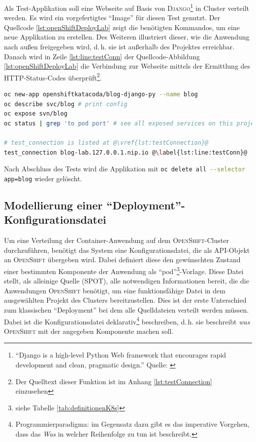 \par
Als Test-Applikation soll eine Webseite auf Basis von \textsc{Django}\footnote{\enquote{Django is a high-level Python Web framework that encourages rapid development and clean, pragmatic design.} Quelle: \cite[][]{django_software_foundation_web_2020}} in Cluster verteilt werden. Es wird ein vorgefertigtes \enquote{Image} für diesen Test genutzt. Der Quellcode \vref{lst:openShiftDeployLab} zeigt die benötigten Kommandos, um eine neue Applikation zu erstellen. Des Weiteren illustriert dieser, wie die Anwendung nach außen freigegeben wird, d.\,h. sie ist außerhalb des Projektes erreichbar. Danach wird in Zeile \vref{lst:line:testConn} der Quellcode-Abbildung \vref{lst:openShiftDeployLab} die Verbindung zur Webseite mittels der Ermittlung des \textsc{HTTP}-Status-Codes überprüft\footnote{Der Quelltext dieser Funktion ist im Anhang \vref{lst:testConnection} einzusehen}.

\begin{lstlisting}[language=bash, caption={Test-\enquote{Deployment} ins \textsc{OpenShift}-Cluster}, label={lst:openShiftDeployLab}]
oc new-app openshiftkatacoda/blog-django-py --name blog
oc describe svc/blog # print config 
oc expose svn/blog
oc status | grep 'to pod port' # see all exposed services on this project

# test_connection is listed at @\vref{lst:testConnection}@
test_connection blog-lab.127.0.0.1.nip.io @\label{lst:line:testConn}@
\end{lstlisting}

Nach Abschluss des Tests wird die Applikation mit \lstinline[language=bash]|oc delete all --selector app=blog| wieder gelöscht.

\subsection{Modellierung einer \enquote{Deployment}-Konfigurationsdatei}
Um eine Verteilung der Container-Anwendung auf dem \textsc{OpenShift}-Cluster durchzuführen, benötigt das System eine Konfigurationsdatei, die als \ac{API}-Objekt an \textsc{OpenShift} übergeben wird. Dabei definiert diese den gewünschten Zustand einer bestimmten Komponente der Anwendung als \enquote{pod}\footnote{siehe Tabelle \vref{tab:definitionenK8s}}-Vorlage.\autocite[vgl.][Application\,$\rightarrow$\,Deployments]{red_hat_inc_okd_2019} Diese Datei stellt, als alleinige Quelle (\ac{SPOT}), alle notwendigen Informationen bereit, die die Anwendungen \textsc{OpenShift} benötigt, um eine funktionsfähige Datei in dem ausgewählten Projekt des Clusters bereitzustellen. Dies ist der erste Unterschied zum klassischen \enquote{Deployment} bei dem alle Quelldateien verteilt werden müssen.\autocite[vgl.][]{dearle_software_2007} Dabei ist die Konfigurationsdatei deklarativ\footnote{Programmierparadigma: im Gegensatz dazu gibt es das imperative Vorgehen, dass das \textit{Was} in welcher Reihenfolge zu tun ist beschreibt.} beschreiben, d.\,h. sie beschreibt \textit{was} \textsc{OpenShift} mit der angegeben Komponente machen soll.

